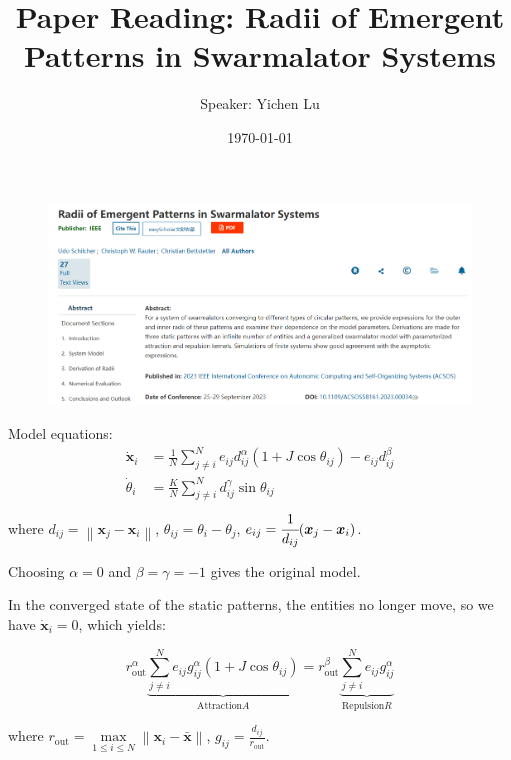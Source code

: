 \documentclass[10pt,aspectratio=43,mathserif,table]{beamer}
\title{Paper Reading: Radii of Emergent Patterns in Swarmalator Systems}
\author{Speaker: Yichen Lu\quad \newline  \newline \quad }
\institute{School of Mathematical Science}
\date{\today}
\begin{document}

\begin{frame}
    \begin{figure}
        \centering
        \includegraphics[width=\textwidth]{front.jpg}
    \end{figure}
\end{frame}


\begin{frame}
    Model equations:
    $$
    \begin{aligned}
        \dot{\boldsymbol{x}}_i&=\frac{1}{N}\sum_{j\ne i}^N{e_{ij}d_{ij}^{\alpha}\left( 1+J\cos \theta _{ij} \right) -e_{ij}d_{ij}^{\beta}}\\
        \dot{\theta}_i&=\frac{K}{N}\sum_{j\ne i}^N{d_{ij}^{\gamma}\sin \theta _{ij}}\\
    \end{aligned}
    $$
    where 
    $d_{ij}=\left\| \boldsymbol{x}_j-\boldsymbol{x}_i \right\|$, 
    $\theta _{ij}=\theta _i-\theta _j$, 
    $e_{ij}=\cfrac{1}{d_{ij}}(\boldsymbol{x}_j-\boldsymbol{x}_i)$.

    Choosing $\alpha = 0$ and $\beta=\gamma=-1$ gives the original model.
\end{frame}

\begin{frame}
    In the converged state of the static patterns, the entities no longer move, so we have $\dot{\boldsymbol{x}}_i = 0$, which yields:

    $$
    r_{\mathrm{out}}^{\alpha}\underset{\mathrm{Attraction} A}{\underbrace{\sum_{j\ne i}^N{e_{ij}g_{ij}^{\alpha}\left( 1+J\cos \theta _{ij} \right)}}}=r_{\mathrm{out}}^{\beta}\underset{\mathrm{Repulsion} R}{\underbrace{\sum_{j\ne i}^N{e_{ij}g_{ij}^{\alpha}}}}
    $$

    where $r_{\mathrm{out}}=\underset{1\le i\le N}{\max}\left\| \boldsymbol{x}_i-\bar{\boldsymbol{x}} \right\| $, 
    $g_{ij}=\frac{d_{ij}}{r_{\mathrm{out}}}$.

\end{frame}
\end{document}
